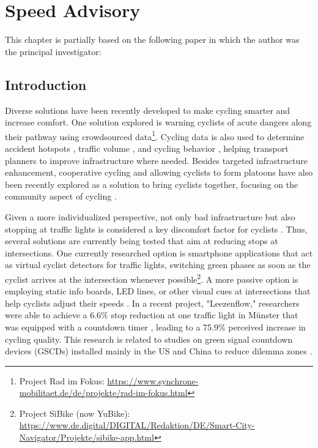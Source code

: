 \chapter{Speed Advisory}\label{ch:app}

\begin{Summary}
This chapter is partially based on the following paper in which the author was the principal investigator:

\cite{matthes2022selecting} 
\end{Summary}

\section{Introduction}

Diverse solutions have been recently developed to make cycling smarter and increase comfort. One solution explored is warning cyclists of acute dangers along their pathway using crowdsourced data\footnote{Project Rad im Fokus: \url{https://www.synchrone-mobilitaet.de/de/projekte/rad-im-fokus.html}}. Cycling data is also used to determine accident hotspots \cite{von_stulpnagel_crash_2022}, traffic volume \cite{lissner_modeling_2018}, and cycling behavior \cite{lisner_gps-data_2020}, helping transport planners to improve infrastructure where needed. Besides targeted infrastructure enhancement, cooperative cycling and allowing cyclists to form platoons have also been recently explored as a solution to bring cyclists together, focusing on the community aspect of cycling \cite{cespedes_group_2019, meng_connected_2022}.

Given a more individualized perspective, not only bad infrastructure but also stopping at traffic lights is considered a key discomfort factor for cyclists \cite{otto_framework_2023}. Thus, several solutions are currently being tested that aim at reducing stops at intersections. One currently researched option is smartphone applications that act as virtual cyclist detectors for traffic lights, switching green phases as soon as the cyclist arrives at the intersection whenever possible\footnote{Project SiBike (now YuBike): \url{https://www.de.digital/DIGITAL/Redaktion/DE/Smart-City-Navigator/Projekte/sibike-app.html}}. A more passive option is employing static info boards, LED lines, or other visual cues at intersections that help cyclists adjust their speeds \cite{de_angelis_green_2019}. In a recent project, "Leezenflow," researchers were able to achieve a 6.6\% stop reduction at one traffic light in Münster that was equipped with a countdown timer \cite{brand_riding_2024}, leading to a 75.9\% perceived increase in cycling quality. This research is related to studies on green signal countdown devices (GSCDs) installed mainly in the US and China to reduce dilemma zones \cite{lum_before-and-after_2006, huang_evaluating_2014, ni_estimating_2014, chen_exploring_2015, islam_improved_2016}. 

